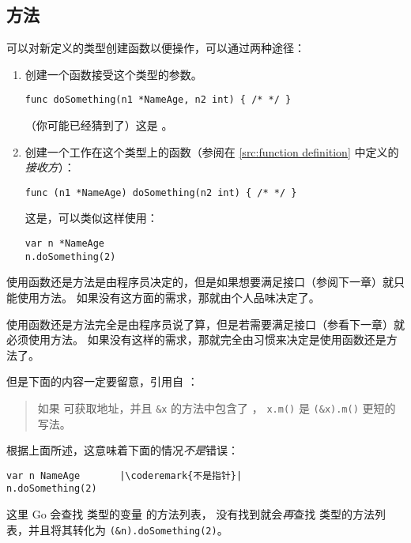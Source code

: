 \subsection{方法}
\label{sec:methods}
可以对新定义的类型创建函数以便操作，可以通过两种途径：
\begin{enumerate}
\item 创建一个函数接受这个类型的参数。
\begin{lstlisting}
func doSomething(n1 *NameAge, n2 int) { /* */ }
\end{lstlisting}
（你可能已经猜到了）这是 。
\item 创建一个工作在这个类型上的函数（参阅在 \ref{src:function definition}
中定义的\emph{接收方}）：
\begin{lstlisting}
func (n1 *NameAge) doSomething(n2 int) { /* */ }
\end{lstlisting}
这是，可以类似这样使用：
\begin{lstlisting}
var n *NameAge
n.doSomething(2)
\end{lstlisting}
\end{enumerate}
使用函数还是方法是由程序员决定的，但是如果想要满足接口（参阅下一章）就只能使用方法。
如果没有这方面的需求，那就由个人品味决定了。

使用函数还是方法完全是由程序员说了算，但是若需要满足接口（参看下一章）就必须使用方法。
如果没有这样的需求，那就完全由习惯来决定是使用函数还是方法了。

但是下面的内容一定要留意，引用自 \cite{go_spec}：
\begin{quote}
如果  可获取地址，并且 \lstinline{&x} 的方法中包含了 ，
\lstinline{x.m()} 是 \mbox{\lstinline{(&x).m()}} 更短的写法。
\end{quote}
根据上面所述，这意味着下面的情况\emph{不是}错误：
\begin{lstlisting}
var n NameAge	    |\coderemark{不是指针}|
n.doSomething(2)    
\end{lstlisting}
这里 Go 会查找  类型的变量  的方法列表，
没有找到就会\emph{再}查找  类型的方法列表，并且将其转化为
\lstinline{(&n).doSomething(2)}。

